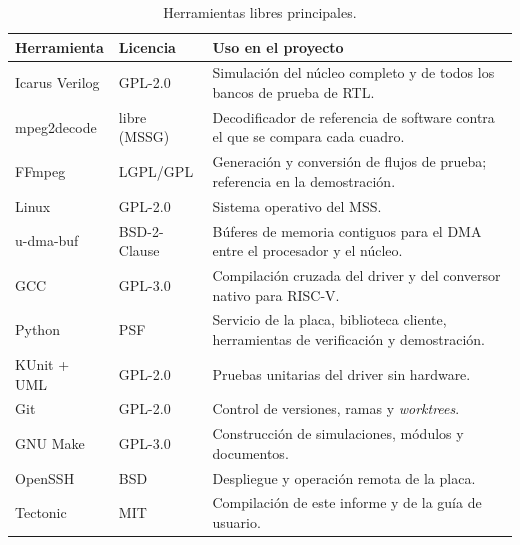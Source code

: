 \begin{table}[ht]
  \centering\small
  \begin{tabularx}{\linewidth}{@{}l l X@{}}
    \toprule
    \textbf{Herramienta} & \textbf{Licencia} & \textbf{Uso en el proyecto} \\
    \midrule
    Icarus Verilog & GPL-2.0 & Simulación del núcleo completo y de todos los
      bancos de prueba de RTL. \\
    mpeg2decode & libre (MSSG) & Decodificador de referencia de software
      contra el que se compara cada cuadro. \\
    FFmpeg & LGPL/GPL & Generación y conversión de flujos de prueba;
      referencia en la demostración. \\
    Linux & GPL-2.0 & Sistema operativo del MSS. \\
    u-dma-buf & BSD-2-Clause & Búferes de memoria contiguos para el DMA
      entre el procesador y el núcleo. \\
    GCC & GPL-3.0 & Compilación cruzada del driver y del conversor nativo
      para RISC-V. \\
    Python & PSF & Servicio de la placa, biblioteca cliente, herramientas de
      verificación y demostración. \\
    KUnit + UML & GPL-2.0 & Pruebas unitarias del driver sin hardware. \\
    Git & GPL-2.0 & Control de versiones, ramas y \emph{worktrees}. \\
    GNU Make & GPL-3.0 & Construcción de simulaciones, módulos y documentos. \\
    OpenSSH & BSD & Despliegue y operación remota de la placa. \\
    Tectonic & MIT & Compilación de este informe y de la guía de usuario. \\
    \bottomrule
  \end{tabularx}
  \caption{Herramientas libres principales.}
  \label{tab:herramientas-principales}
\end{table}
